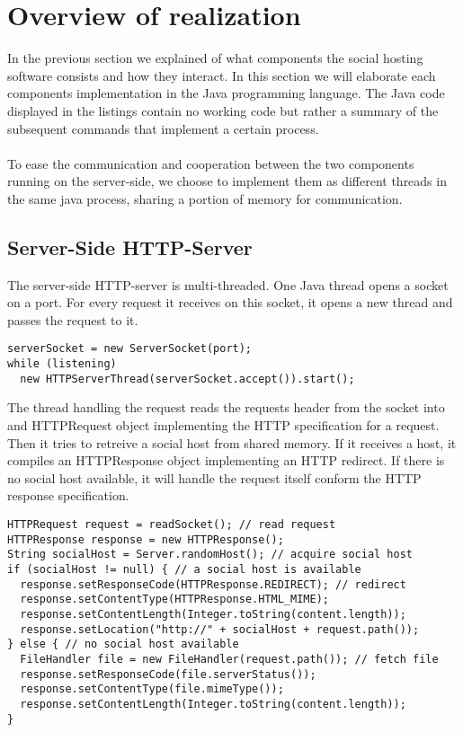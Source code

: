\documentclass[a4paper, 10pt]{article}
\begin{document}
\section{Overview of realization}
In the previous section we explained of what components the social hosting software consists and how they interact. In this section we will elaborate each components implementation in the Java programming language. The Java code displayed in the listings contain no working code but rather a summary of the subsequent commands that implement a certain process.
\\
\\
To ease the communication and cooperation between the two components running on the server-side, we choose to implement them as different threads in the same java process, sharing a portion of memory for communication.

\subsection{Server-Side HTTP-Server}
The server-side HTTP-server is multi-threaded. One Java thread opens a socket on a port. For every request it receives on this socket, it opens a new thread and passes the request to it. 
\begin{lstlisting}
serverSocket = new ServerSocket(port);
while (listening)
  new HTTPServerThread(serverSocket.accept()).start();
\end{lstlisting}
The thread handling the request reads the requests header from the socket into and HTTPRequest object implementing the HTTP specification for a request. Then it tries to retreive a social host from shared memory. If it receives a host, it compiles an HTTPResponse object implementing an HTTP redirect. If there is no social host available, it will handle the request itself conform the HTTP response specification.
\begin{lstlisting}
HTTPRequest request = readSocket(); // read request
HTTPResponse response = new HTTPResponse();
String socialHost = Server.randomHost(); // acquire social host
if (socialHost != null) { // a social host is available
  response.setResponseCode(HTTPResponse.REDIRECT); // redirect
  response.setContentType(HTTPResponse.HTML_MIME);
  response.setContentLength(Integer.toString(content.length));
  response.setLocation("http://" + socialHost + request.path());
} else { // no social host available
  FileHandler file = new FileHandler(request.path()); // fetch file
  response.setResponseCode(file.serverStatus());
  response.setContentType(file.mimeType());
  response.setContentLength(Integer.toString(content.length));
}
\end{lstlisting}
\end{document}

